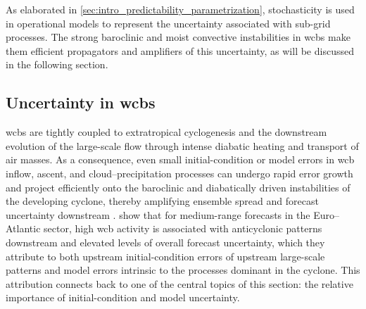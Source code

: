 As elaborated in \cref{sec:intro_predictability_parametrization},
stochasticity is used in operational models to represent the uncertainty
associated with sub-grid processes. The strong baroclinic and moist convective
instabilities in \glspl{wcb} make them efficient propagators and amplifiers
of this uncertainty, as will be discussed in the following section.

\subsection{Uncertainty in \glspl{wcb}} \label{sec:intro_wcb_uncertainty}
\glspl{wcb} are tightly coupled to extratropical cyclogenesis and the
downstream evolution of the large-scale flow through intense diabatic
heating and transport of air masses. As a consequence, even small
initial-condition or model errors in \gls{wcb} inflow, ascent, and
cloud--precipitation processes can undergo rapid error growth and project
efficiently onto the baroclinic and diabatically driven instabilities of
the developing cyclone, thereby amplifying ensemble spread and forecast
uncertainty downstream \parencite{rodwellWhyWarmConveyor2018,
    baumgartProcessesGoverningAmplification2019,
    wandelSystematicEvaluationWarm2021}.
\textcite{picklWarmConveyorBelts2023} show that for medium-range forecasts
in the Euro--Atlantic sector, high \gls{wcb} activity is associated with
anticyclonic patterns downstream and elevated levels of overall forecast
uncertainty, which they attribute to both upstream initial-condition errors
of upstream large-scale patterns
and model errors intrinsic to the processes dominant in the cyclone. This
attribution connects back to one of the central topics of this section:
the relative importance of initial-condition and model uncertainty.

